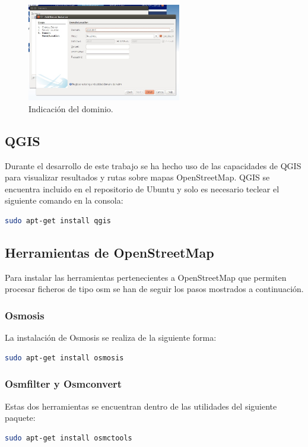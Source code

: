 \begin{figure}[h]
  \centering
    \includegraphics[width=0.6\textwidth]{../img/instalacion/sv3.jpg}
  \caption{Indicación del dominio.}
  \label{sv3}
\end{figure}

\subsection{QGIS}

Durante el desarrollo de este trabajo se ha hecho uso de las capacidades de QGIS para visualizar resultados y rutas sobre mapas OpenStreetMap. QGIS se encuentra incluido en el repositorio de Ubuntu y solo es necesario teclear el siguiente comando en la consola:

\begin{lstlisting}[language=bash]
	sudo apt-get install qgis
\end{lstlisting}

\subsection{Herramientas de OpenStreetMap}
Para instalar las herramientas pertenecientes a OpenStreetMap que permiten procesar ficheros de tipo osm se han de seguir los pasos mostrados a continuación.

\subsubsection{Osmosis}
La instalación de Osmosis se realiza de la siguiente forma:
\begin{lstlisting}[language=bash]
	sudo apt-get install osmosis
\end{lstlisting}

\subsubsection{Osmfilter y Osmconvert}
Estas dos herramientas se encuentran dentro de las utilidades del siguiente paquete:
\begin{lstlisting}[language=bash]
	sudo apt-get install osmctools
\end{lstlisting}

